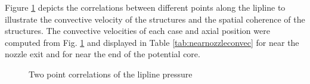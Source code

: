 \documentclass[english]{aiaa-tc}
\begin{document}
Figure \ref{liplineconvec} depicts the correlations between different points along the lipline to illustrate the convective velocity of the structures and the spatial coherence of the structures. 
The convective velocities of each case and axial position were computed from Fig. \ref{liplineconvec} and displayed in Table \ref{tab:nearnozzleconvec} for near the nozzle exit and for near the end of the potential core. 
\begin{figure} 
\begin{centering}

\end{centering}
\caption{Two point correlations of the lipline pressure}\label{liplineconvec}
\end{figure}
\end{document}
